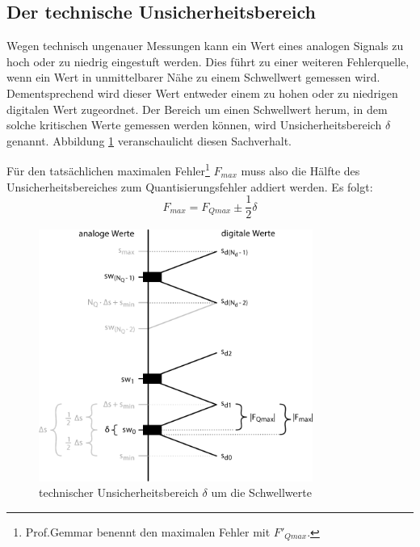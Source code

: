 \documentclass[11pt,a4paper]{scrreprt}
\begin{document}
\subsection{Der technische Unsicherheitsbereich}
Wegen technisch ungenauer Messungen kann ein Wert eines analogen Signals zu hoch oder zu niedrig eingestuft werden. Dies führt zu einer weiteren Fehlerquelle, wenn ein Wert in unmittelbarer Nähe zu einem Schwellwert gemessen wird. Dementsprechend wird dieser Wert entweder einem zu hohen oder zu niedrigen digitalen Wert zugeordnet. Der Bereich um einen Schwellwert herum, in dem solche kritischen Werte gemessen werden können, wird Unsicherheitsbereich $\delta$ genannt. Abbildung \ref{AD-Wandl_vollst_Sig-Umf_mit_delta} veranschaulicht diesen Sachverhalt.

Für den tatsächlichen maximalen Fehler\footnote{Prof.Gemmar benennt den maximalen Fehler mit $F'_{Qmax}$.} $F_{max}$ muss also die Hälfte des Unsicherheitsbereiches zum Quantisierungsfehler addiert werden. Es folgt:
\[
	F_{max} = F_{Qmax} \pm \frac{1}{2} \delta
\]

\begin{figure}[htbp] %
	\centering
	\includegraphics[width=0.8\textwidth]{AD-Wandl_vollst_Sig-Umf_mit_delta.png}
	\caption{technischer Unsicherheitsbereich $\delta$ um die Schwellwerte}
	\label{AD-Wandl_vollst_Sig-Umf_mit_delta}
\end{figure}

\end{document}
